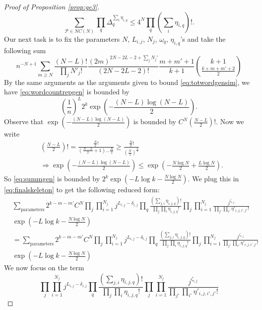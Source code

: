 \documentclass[12pt]{article}
\numberwithin{equation}{section}
\numberwithin{equation}{section}
\theoremstyle{definition}
\renewcommand{\1}{\bf 1}
\begin{document}
\begin{proof}[Proof of Proposition \ref{prop:ge3}]
\begin{equation}
\sum_{\mathcal{P} \in NC(N)}\prod_{q}\Delta_{q}^{\sum_{i}\eta_{i,q}}\le 4^{N}\prod_{q}\left( \sum_{i} \eta_{i,q}\right)!.
\end{equation} 
Our next task is to fix the parameters $N$, $L_{i,j}$, $N_{j}$, $\omega_{q}$, $\eta_{i,q}$'s and take the following sum
\begin{equation}\label{eq:wordcountrepgen}
n^{-N+1}\sum_{m\ge N}\frac{(N-L)!}{\prod_{j}N'_{j}!}\frac{(2m)^{2N-2L-2+ \sum_{j}N_{j}'}}{(2N-2L-2)!}\frac{m+m'+1}{k+1}\binom{k+1}{\frac{k+m+m' +2}{2}}
\end{equation}
By the same arguments as the arguments given to bound \eqref{eq:totwordgensim}, we have \eqref{eq:wordcountrepgen} is bounded by 
\begin{equation}\label{eq:summgen}
\left(  \frac{1}{n}\right)^{L}2^{k}\exp\left( - \frac{(N-L)\log (N-L)}{2} \right).
\end{equation}
Observe that $\exp\left( - \frac{(N-L)\log (N-L)}{2} \right)$ is bounded by $C^{N}\left( \frac{N-L}{2} \right)!$.
Now we write 
\begin{equation}
\begin{split}
& \left( \frac{N-L}{2} \right)!= \frac{\frac{N}{2}!}{\left( \frac{N-L}{2} +1 \right) \ldots \frac{N}{2}}\ge \frac{\frac{N}{2}!}{\left(\frac{N}{2}\right)^{\frac{L}{2}}}\\
& \Rightarrow \exp\left( - \frac{(N-L)\log (N-L)}{2} \right)\le \exp\left( -\frac{N\log N}{2} + \frac{L\log N}{2}\right).
\end{split}
\end{equation}
So \eqref{eq:summgen} is bounded by $2^{k}\exp\left( - L \log k - \frac{N\log N}{2}\right).$
We plug this in \eqref{eq:finalskeleton} to get the following reduced form: 
\begin{equation}\label{dot}
\begin{split}
&\sum_{\text{parameters}}2^{k-m-m'}C^{N} \prod_{j}\prod_{i=1}^{N_{j}}j^{L_{i,j}-\delta_{i,j}}\prod_{q} \frac{\left(\sum_{j,i}\eta_{i,j,q}\right)! }{\prod_{j}\prod_{i}\eta_{i,j,q}!}\prod_{j}\prod_{i=1}^{N_{j}} \frac{j^{\zeta_{i,j}}}{\prod_{j'}\prod_{i'} \eta'_{i,j,i',j'}!}\\
&\exp\left(  - L \log k - \frac{N\log N}{2}   \right)\\
&= \sum_{\text{parameters}}2^{k-m-m'}C^{N} \prod_{j}\prod_{i=1}^{N_{j}}j^{L_{i,j}-\delta_{i,j}}\prod_{q} \frac{\left(\sum_{j,i}\eta_{i,j,q}\right)! }{\prod_{j}\prod_{i}\eta_{i,j,q}!}\prod_{j}\prod_{i=1}^{N_{j}} \frac{j^{\zeta_{i,j}}}{\prod_{j'}\prod_{i'} \eta'_{i,j,i',j'}!}\\
& \exp\left(  - L \log k - \frac{N\log N}{2}  \right)
\end{split}
\end{equation}
We now focus on the term 
\[
\prod_{j}\prod_{i=1}^{N_{j}}j^{L_{i,j}-\delta_{i,j}}\prod_{q} \frac{\left(\sum_{j,i}\eta_{i,j,q}\right)! }{\prod_{j}\prod_{i}\eta_{i,j,q}!}\prod_{j}\prod_{i=1}^{N_{j}} \frac{j^{\zeta_{i,j}}}{\prod_{j'}\prod_{i'} \eta'_{i,j,i',j'}!}
\]


\end{proof}
\end{document}
